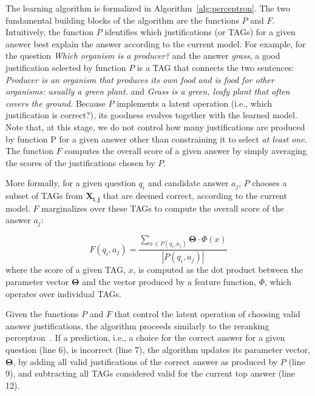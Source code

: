 The learning algorithm is formalized in Algorithm~\ref{alg:perceptron}. The two fundamental building blocks of the algorithm are the functions $P$ and $F$. 
Intuitively, the function $P$ identifies which justifications (or TAGs) for a given answer best explain the answer according to the current model. For example, for the question {\em Which organism is a producer?} and the answer {\em grass}, a good justification selected by function $P$ is a TAG that connects the two sentences: {\em Producer is an organism that produces its own food and is food for other organisms: usually a green plant.} and {\em Grass is a green, leafy plant that often covers the ground.} 
Because $P$ implements a latent operation (i.e., which justification is correct?), its goodness evolves together with the learned model. 
Note that, at this stage, we do not control how many justifications are produced by function P for a given answer other than constraining it to select {\em at least one}. The function $F$ computes the overall score of a given answer by simply averaging the scores of the justifications chosen by $P$. 

More formally, for a given question $q_i$ and candidate answer $a_j$, $P$ chooses a subset of TAGs from $\boldsymbol{X_{i,j}}$ that are deemed correct, according to the current model. $F$ marginalizes over these TAGs to compute the overall score of the answer $a_j$:

\begin{equation}
\label{eq:F}
F(q_i, a_j) = \frac{\sum_{x \in P(q_i, a_j)} \boldsymbol{\Theta} \cdot \Phi(x)}{|P(q_i, a_j)|}
\end{equation}
where the score of a given TAG, $x$, is computed as the dot product between the parameter vector $\boldsymbol{\Theta}$  and the vector produced by a feature function, $\Phi$, which operates over individual TAGs. 

Given the functions $P$ and $F$ that control the latent operation of choosing valid answer justifications, the algorithm proceeds similarly to the reranking perceptron~\citep{Shen:Joshi:2005}. If a prediction, i.e., a choice for the correct answer for a given question (line 6), is incorrect (line 7), the algorithm updates its parameter vector, $\boldsymbol{\Theta}$, by adding all valid justifications of the correct answer as produced by $P$ (line 9), and subtracting all TAGs considered valid for the current top answer (line 12). 


